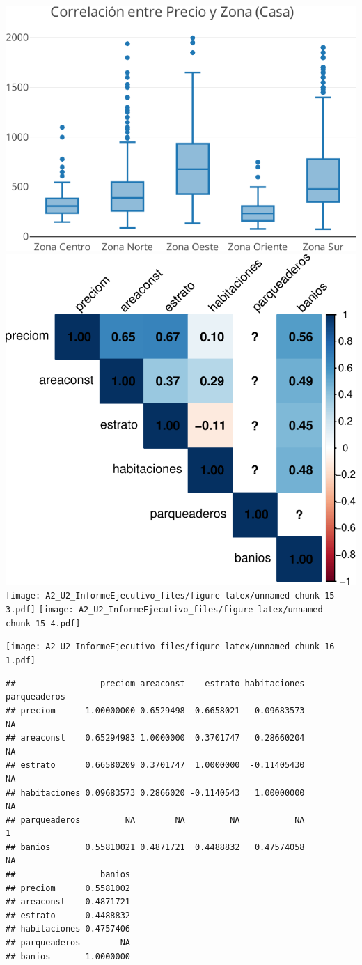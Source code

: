 \documentclass[
]{article}
\begin{document}
\includegraphics{A2_U2_InformeEjecutivo_files/figure-latex/unnamed-chunk-15-1.pdf}
\includegraphics{A2_U2_InformeEjecutivo_files/figure-latex/unnamed-chunk-15-2.pdf}
\texttt{[image: A2\_U2\_InformeEjecutivo\_files/figure-latex/unnamed-chunk-15-3.pdf]}
\texttt{[image: A2\_U2\_InformeEjecutivo\_files/figure-latex/unnamed-chunk-15-4.pdf]}

\texttt{[image: A2\_U2\_InformeEjecutivo\_files/figure-latex/unnamed-chunk-16-1.pdf]}

\begin{verbatim}
##                 preciom areaconst    estrato habitaciones parqueaderos
## preciom      1.00000000 0.6529498  0.6658021   0.09683573           NA
## areaconst    0.65294983 1.0000000  0.3701747   0.28660204           NA
## estrato      0.66580209 0.3701747  1.0000000  -0.11405430           NA
## habitaciones 0.09683573 0.2866020 -0.1140543   1.00000000           NA
## parqueaderos         NA        NA         NA           NA            1
## banios       0.55810021 0.4871721  0.4488832   0.47574058           NA
##                 banios
## preciom      0.5581002
## areaconst    0.4871721
## estrato      0.4488832
## habitaciones 0.4757406
## parqueaderos        NA
## banios       1.0000000
\end{verbatim}
\end{document}
